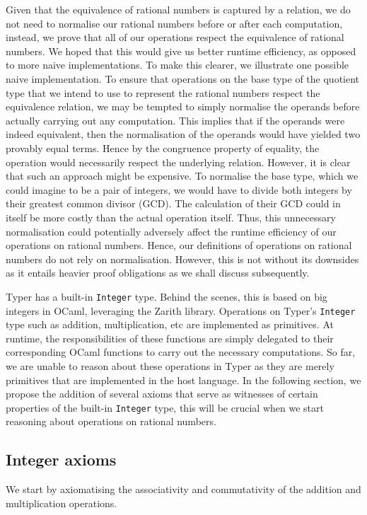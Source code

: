 \documentclass[12pt,twoside,maitrise]{dms}
\theoremstyle{definition}
\numberwithin{equation}{section}
\numberwithin{table}{chapter}
\numberwithin{figure}{chapter}
\newcommand\id[1] {\texttt{#1}}
\begin{document}
Given that the equivalence of rational numbers is captured by a relation, we do
not need to normalise our rational numbers before or after each computation,
instead, we prove that all of our operations respect the equivalence of rational
numbers. We hoped that this would give us better runtime efficiency, as opposed
to more naive implementations. To make this clearer, we illustrate one possible
naive implementation. To ensure that operations on the base type of the quotient
type that we intend to use to represent the rational numbers respect the
equivalence relation, we may be tempted to simply normalise the operands before
actually carrying out any computation. This implies that if the operands were
indeed equivalent, then the normalisation of the operands would have yielded two
provably equal terms. Hence by the congruence property of equality, the
operation would necessarily respect the underlying relation. However, it is
clear that such an approach might be expensive. To normalise the base type,
which we could imagine to be a pair of integers, we would have to divide both
integers by their greatest common divisor (GCD). The calculation of their GCD
could in itself be more costly than the actual operation itself. Thus, this
unnecessary normalisation could potentially adversely affect the runtime
efficiency of our operations on rational numbers. Hence, our definitions of
operations on rational numbers do not rely on normalisation. However, this is
not without its downsides as it entails heavier proof obligations as we shall
discuss subsequently.

Typer has a built-in \id{Integer} type. Behind the scenes, this is based on big
integers in OCaml, leveraging the Zarith library. Operations on Typer's
\id{Integer} type such as addition, multiplication, etc are implemented as
primitives. At runtime, the responsibilities of these functions are simply
delegated to their corresponding OCaml functions to carry out the necessary
computations. So far, we are unable to reason about these operations in Typer as
they are merely primitives that are implemented in the host language. In the
following section, we propose the addition of several axioms that serve as
witnesses of certain properties of the built-in \id{Integer} type, this will be
crucial when we start reasoning about operations on rational numbers.

\subsection*{Integer axioms}
We start by axiomatising the associativity and commutativity of the addition and multiplication operations.
\end{document}
